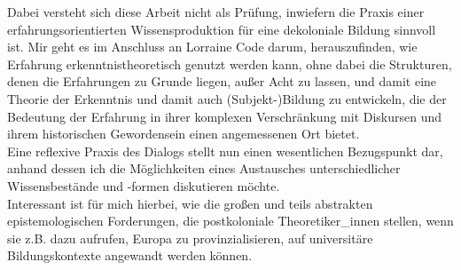 \noindent Dabei versteht sich diese Arbeit nicht als Prüfung, inwiefern die Praxis einer
erfahrungsorientierten Wissensproduktion für eine dekoloniale Bildung sinnvoll
ist. Mir geht es im Anschluss an Lorraine Code darum, herauszufinden, wie
Erfahrung erkenntnistheoretisch genutzt werden kann, ohne dabei die Strukturen,
denen die Erfahrungen zu Grunde liegen, außer Acht zu lassen, und damit eine
Theorie der Erkenntnis und damit auch (Subjekt-)Bildung zu entwickeln, die der
Bedeutung der Erfahrung in ihrer komplexen Verschränkung mit Diskursen und
ihrem historischen Gewordensein einen angemessenen Ort
bietet.\footnotemark{}\\

\noindent Eine reflexive Praxis des Dialogs stellt nun einen wesentlichen Bezugspunkt
dar, anhand dessen ich die Möglichkeiten eines Austausches unterschiedlicher
Wissensbestände und -formen diskutieren möchte.\\
Interessant ist für mich
hierbei, wie die großen und teils abstrakten epistemologischen Forderungen, die
postkoloniale Theoretiker\_innen stellen, wenn sie z.B. dazu aufrufen, Europa zu
provinzialisieren,\footnotemark{} auf universitäre Bildungskontexte angewandt werden
können.\\

